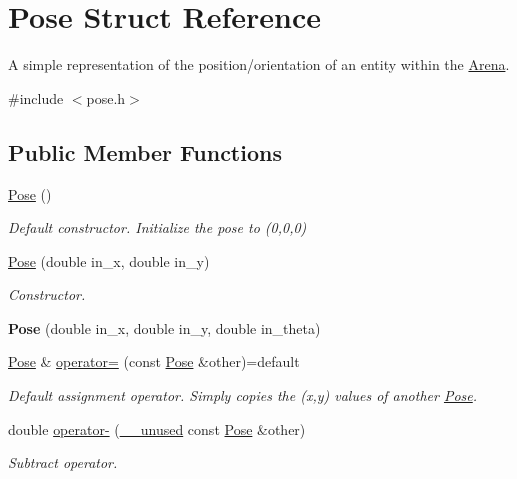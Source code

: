\hypertarget{structPose}{}\section{Pose Struct Reference}
\label{structPose}


A simple representation of the position/orientation of an entity within the \hyperlink{classArena}{Arena}.  




{\ttfamily \#include $<$pose.\+h$>$}

\subsection*{Public Member Functions}
\begin{DoxyCompactItemize}
\item 
\hyperlink{structPose_a8a4171c8a6b09e37fb011997da9ea2ad}{Pose} ()\hypertarget{structPose_a8a4171c8a6b09e37fb011997da9ea2ad}{}\label{structPose_a8a4171c8a6b09e37fb011997da9ea2ad}

\begin{DoxyCompactList}\small\item\em Default constructor. Initialize the pose to (0,0,0) \end{DoxyCompactList}\item 
\hyperlink{structPose_ac947d7046547d883f782ab2408cb80ed}{Pose} (double in\+\_\+x, double in\+\_\+y)
\begin{DoxyCompactList}\small\item\em Constructor. \end{DoxyCompactList}\item 
{\bfseries Pose} (double in\+\_\+x, double in\+\_\+y, double in\+\_\+theta)\hypertarget{structPose_a6ebb8a1510c5915fa1dbec0f7ba0ad1c}{}\label{structPose_a6ebb8a1510c5915fa1dbec0f7ba0ad1c}

\item 
\hyperlink{structPose}{Pose} \& \hyperlink{structPose_aec0a9478daefa358aa2f1873cbaf0271}{operator=} (const \hyperlink{structPose}{Pose} \&other)=default
\begin{DoxyCompactList}\small\item\em Default assignment operator. Simply copies the (x,y) values of another \hyperlink{structPose}{Pose}. \end{DoxyCompactList}\item 
double \hyperlink{structPose_a8cecc533fda99d9b3dd2dfb7be782890}{operator-\/} (\hyperlink{common_8h_a2e3484535ee610c8e19e9859563abe48}{\+\_\+\+\_\+unused} const \hyperlink{structPose}{Pose} \&other)
\begin{DoxyCompactList}\small\item\em Subtract operator. \end{DoxyCompactList}\end{DoxyCompactItemize}
